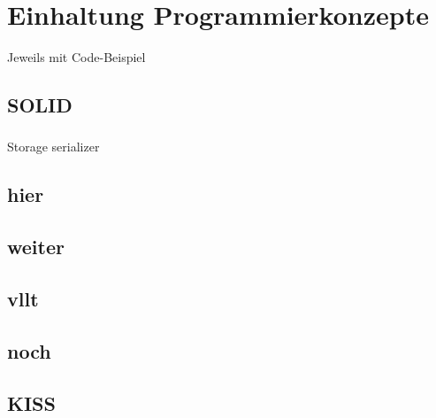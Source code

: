 
\section{Einhaltung Programmierkonzepte}

Jeweils mit Code-Beispiel

\subsection{SOLID}
\subsubsection{\textPrincipleSingleResponsibility}
\label{principle_single_responsibility}
Storage serializer

\subsubsection{\textPrincipleOpenClosed}
\label{principle_open_closed}

\subsubsection{\textPrincipleLiskovSubstitution}
\label{principle_liskov_substitution}


\subsubsection{\textPrincipleInterfaceSegregation}
\label{principle_interface_segregation}

\subsubsection{\textPrincipleDependencyInversion}
\label{principle_dependency_inversion}

\subsection{hier}
\subsection{weiter}
\subsection{vllt}
\subsection{noch}
\subsection{KISS}